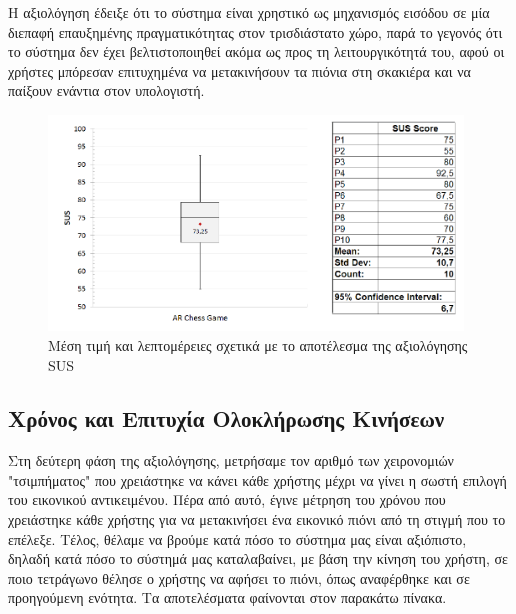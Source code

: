 Η αξιολόγηση έδειξε ότι το σύστημα είναι χρηστικό ως μηχανισμός εισόδου σε μία διεπαφή επαυξημένης πραγματικότητας στον τρισδιάστατο χώρο, παρά το γεγονός ότι το σύστημα δεν έχει βελτιστοποιηθεί ακόμα ως προς τη λειτουργικότητά του, αφού οι χρήστες μπόρεσαν επιτυχημένα να μετακινήσουν τα πιόνια στη σκακιέρα και να παίξουν ενάντια στον υπολογιστή. 

\begin{figure}[H]
    \centering
    \includegraphics[width=0.98\textwidth]{Files/Figures/sus2.pdf}
    \caption[Μέση τιμή και λεπτομέρειες σχετικά με το αποτέλεσμα της αξιολόγησης SUS]{Μέση τιμή και λεπτομέρειες σχετικά με το αποτέλεσμα της αξιολόγησης SUS}
    \label{fig:sus_res}
\end{figure}


\subsection{Χρόνος και Επιτυχία Ολοκλήρωσης Κινήσεων}


Στη δεύτερη φάση της αξιολόγησης, μετρήσαμε τον αριθμό των χειρονομιών "τσιμπήματος" που χρειάστηκε να κάνει κάθε χρήστης μέχρι να γίνει η σωστή επιλογή του εικονικού αντικειμένου. Πέρα από αυτό, έγινε μέτρηση του χρόνου που χρειάστηκε κάθε χρήστης για να μετακινήσει ένα εικονικό πιόνι από τη στιγμή που το επέλεξε. Τέλος, θέλαμε να βρούμε κατά πόσο το σύστημα μας είναι αξιόπιστο, δηλαδή κατά πόσο το σύστημά μας καταλαβαίνει, με βάση την κίνηση του χρήστη, σε ποιο τετράγωνο θέλησε ο χρήστης να αφήσει το πιόνι, όπως αναφέρθηκε και σε προηγούμενη ενότητα. Τα αποτελέσματα φαίνονται στον παρακάτω πίνακα.


